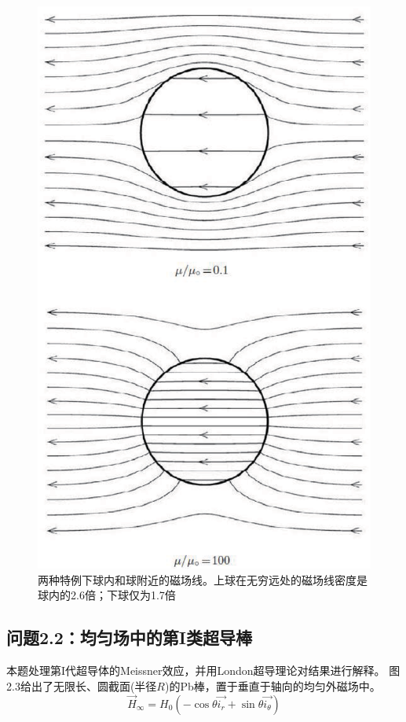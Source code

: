 \begin{figure}[htbp]
  \centering
 \includegraphics[scale=0.4]{chpt2/figs/fig2.2.eps}
  \caption{两种特例下球内和球附近的磁场线。上球在无穷远处的磁场线密度是球内的2.6倍；下球仅为1.7倍}
\end{figure}

\subsection{问题2.2：均匀场中的第I类超导棒}
本题处理第I代超导体的Meissner效应，并用London超导理论对结果进行解释。
图2.3给出了无限长、圆截面(半径$R$)的Pb棒，置于垂直于轴向的均匀外磁场中。
\begin{equation*}\label{eqn:2.40}
  \vec{H}_\infty = H_0 (-\cos \theta\vec{i_r}+\sin\theta\vec{i_\theta}) \tag{2.40}
\end{equation*}

